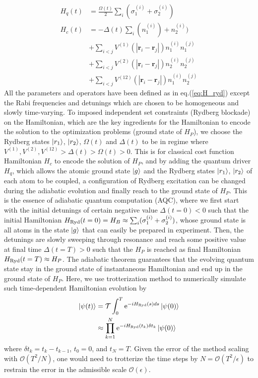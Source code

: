 \documentclass[%
 reprint,
nofootinbib,
 amsmath,amssymb,
 aps,
pra,
floatfix,
]{revtex4-2}
\begin{document}
\begin{align}\label{eq:H_Ryd_t}
H_q(t) &=  \frac{\Omega(t)}{2}\sum_{i} (\sigma^{(i)}_1 + \sigma^{(i)}_2) \\
H_c(t) &= -\Delta(t) \sum_{i} (n^{(i)}_1 ) +  n^{(i)}_2)  \\ 
&+ \sum_{i<j} V^{(1)}(|\boldsymbol{r}_i - \boldsymbol{r}_j|) n^{(i)}_1 n^{(j)}_1  \nonumber \\ 
&+ \sum_{i<j} V^{(2)}(|\boldsymbol{r}_i - \boldsymbol{r}_j|) n^{(i)}_2 n^{(j)}_2 \nonumber \\
&+ \sum_{i<j} V^{(12)}(|\boldsymbol{r}_i - \boldsymbol{r}_j|) n^{(i)}_1 n^{(j)}_2 \nonumber
\end{align}
All the parameters and operators have been defined as in eq.(\ref{eq:H_ryd}) except the Rabi frequencies and detunings which are chosen to be homogeneous and slowly time-varying. To imposed independent set constraints (Rydberg blockade) on the Hamiltonian, which are the key ingredients for the Hamiltonian to encode the solution to the optimization problems (ground state of $H_P$), we choose the Rydberg states $\ket{r_1}$, $\ket{r_2}$, $\Omega(t)$ and $\Delta(t)$ to be in regime where $V^{(1)},V^{(2)},V^{(12)} > \Delta(t) > \Omega(t) > 0$. This is for classical cost function Hamiltonian $H_c$ to encode the solution of $H_P$, and by adding the quantum driver $H_q$, which allows the atomic ground state $\ket{g}$ and the Rydberg states $\ket{r_1}$, $\ket{r_2}$ of each atom to be coupled, a configuration of Rydberg excitation can be changed during the adiabatic evolution and finally reach to the ground state of $H_P$. This is the essence of adiabatic quantum computation (AQC), where we first start with the initial detunings of certain negative value $\Delta(t=0) < 0$ such that the initial Hamiltonian $H_{\rm Ryd}(t=0) = H_B \approx \sum_{i} (\sigma^{(i)}_1 +\sigma^{(i)}_2)$, whose ground state is all atoms in the state $\ket{g}$ that can easily be prepared in experiment. Then, the detunings are slowly sweeping through resonance and reach some positive value at final time $\Delta(t=T)>0$ such that the $H_P$ is reached as final Hamiltonian $H_{\rm Ryd}(t=T) \approx H_P$. The adiabatic theorem guarantees that the evolving quantum state stay in the ground state of instantaneous Hamiltonian and end up in the ground state of $H_P$. Here, we use trotterization method to numerically simulate such time-dependent Hamiltonian evolution by 
\begin{align}
    \ket{\psi(t)} &= \mathcal{T}\int_{0}^{T} {\rm e}^{-i H_{\rm Ryd}(s)ds} \ket{\psi(0)} \nonumber \\
    &\approx \prod_{k=1}^{N}  {\rm e}^{-i H_{\rm Ryd}(t_k)\delta t_k} \ket{\psi(0)}
\end{align}
where $\delta t_k = t_k - t_{k-1}$, $t_0 = 0$, and $t_N=T$. Given the error of the method scaling with $\mathcal{O}(T^2/N)$, one would need to trotterize the time steps by $N = \mathcal{O}(T^2/\epsilon)$ to restrain the error in the admissible scale $\mathcal{O}(\epsilon)$.
\end{document}
